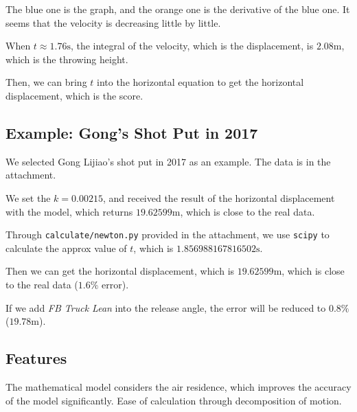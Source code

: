 \documentclass{article}
\begin{document}
The blue one is the graph, and the orange one is the derivative of the blue one. It seems that the velocity is decreasing little by little.

When $t \approx 1.76 \si{\second}$, the integral of the velocity, which is the displacement, is $2.08 \si{\meter}$, which is the throwing height.

Then, we can bring $t$ into the horizontal equation to get the horizontal displacement, which is the score.

\subsection{Example: Gong's Shot Put in 2017}

We selected Gong Lijiao's shot put in 2017 as an example. The data is in the attachment.

We set the $k = 0.00215$, and received the result of the horizontal displacement with the model, which returns $19.62599 \si{\meter}$, which is close to the real data.

Through \texttt{calculate/newton.py} provided in the attachment, we use \texttt{scipy} to calculate the approx value of $t$, which is $1.856988167816502 \si{\second}$.

Then we can get the horizontal displacement, which is $19.62599 \si{\meter}$, which is close to the real data ($1.6\%$ error).

If we add \textit{FB Truck Lean} into the release angle, the error will be reduced to $0.8\%$ ($19.78 \si{\meter}$).

\subsection{Features}

The mathematical model considers the air residence, which improves the accuracy of the model significantly. Ease of calculation through decomposition of motion.
\end{document}
